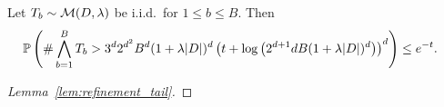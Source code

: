 \begin{lemma}
  \label{lem:refinement_tail}

  Let $T_b \sim \cM(D, \lambda)$ be i.i.d.\ for $1 \leq b \leq B$. Then
  \begin{align*}
    \P\left(
      \# \bigwedge_{b=1}^B T_b
      > 3^d 2^{d^2} B^d (1+\lambda|D|)^d
      \left(
        t + \log\left( 2^{d+1} dB (1 + \lambda |D|)^d \right)
      \right)^d
    \right)
    &\leq e^{-t}.
  \end{align*}

\end{lemma}

\begin{proof}[Lemma~\ref{lem:refinement_tail}]


\end{proof}
